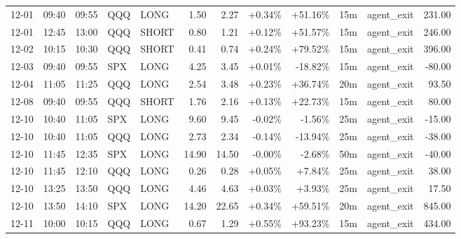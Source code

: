 \documentclass[11pt,a4paper]{article}
\begin{document}
\begin{center}
\begin{longtable}{>{\color{txtmain}}l l l l l r r r r r >{\color{txtmain}}l r}
12-01 & 09:40 & 09:55 & QQQ & LONG & 1.50 & 2.27 & \textcolor{wingreen}{+0.34\%} & \textcolor{wingreen}{+51.16\%} & 15m & agent\_exit & \textcolor{wingreen}{231.00} \\
12-01 & 12:45 & 13:00 & QQQ & SHORT & 0.80 & 1.21 & \textcolor{wingreen}{+0.12\%} & \textcolor{wingreen}{+51.57\%} & 15m & agent\_exit & \textcolor{wingreen}{246.00} \\
12-02 & 10:15 & 10:30 & QQQ & SHORT & 0.41 & 0.74 & \textcolor{wingreen}{+0.24\%} & \textcolor{wingreen}{+79.52\%} & 15m & agent\_exit & \textcolor{wingreen}{396.00} \\
12-03 & 09:40 & 09:55 & SPX & LONG & 4.25 & 3.45 & \textcolor{wingreen}{+0.01\%} & \textcolor{lossred}{-18.82\%} & 15m & agent\_exit & \textcolor{lossred}{-80.00} \\
12-04 & 11:05 & 11:25 & QQQ & LONG & 2.54 & 3.48 & \textcolor{wingreen}{+0.23\%} & \textcolor{wingreen}{+36.74\%} & 20m & agent\_exit & \textcolor{wingreen}{93.50} \\
12-08 & 09:40 & 09:55 & QQQ & SHORT & 1.76 & 2.16 & \textcolor{wingreen}{+0.13\%} & \textcolor{wingreen}{+22.73\%} & 15m & agent\_exit & \textcolor{wingreen}{80.00} \\
12-10 & 10:40 & 11:05 & SPX & LONG & 9.60 & 9.45 & \textcolor{lossred}{-0.02\%} & \textcolor{lossred}{-1.56\%} & 25m & agent\_exit & \textcolor{lossred}{-15.00} \\
12-10 & 10:40 & 11:05 & QQQ & LONG & 2.73 & 2.34 & \textcolor{lossred}{-0.14\%} & \textcolor{lossred}{-13.94\%} & 25m & agent\_exit & \textcolor{lossred}{-38.00} \\
12-10 & 11:45 & 12:35 & SPX & LONG & 14.90 & 14.50 & \textcolor{lossred}{-0.00\%} & \textcolor{lossred}{-2.68\%} & 50m & agent\_exit & \textcolor{lossred}{-40.00} \\
12-10 & 11:45 & 12:10 & QQQ & LONG & 0.26 & 0.28 & \textcolor{wingreen}{+0.05\%} & \textcolor{wingreen}{+7.84\%} & 25m & agent\_exit & \textcolor{wingreen}{38.00} \\
12-10 & 13:25 & 13:50 & QQQ & LONG & 4.46 & 4.63 & \textcolor{wingreen}{+0.03\%} & \textcolor{wingreen}{+3.93\%} & 25m & agent\_exit & \textcolor{wingreen}{17.50} \\
12-10 & 13:50 & 14:10 & SPX & LONG & 14.20 & 22.65 & \textcolor{wingreen}{+0.34\%} & \textcolor{wingreen}{+59.51\%} & 20m & agent\_exit & \textcolor{wingreen}{845.00} \\
12-11 & 10:00 & 10:15 & QQQ & LONG & 0.67 & 1.29 & \textcolor{wingreen}{+0.55\%} & \textcolor{wingreen}{+93.23\%} & 15m & agent\_exit & \textcolor{wingreen}{434.00} \\

\end{longtable}
\end{center}
\end{document}
